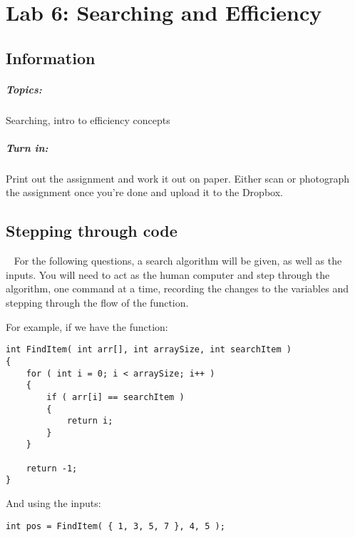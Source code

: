 \documentclass[a4paper,12pt]{book}
\title{}
\author{Rachel Morris}
\date{\today}
\newcommand{\laLab}{Lab 6: Searching and Efficiency\ }
\begin{document}
    \chapter*{\laLab} 

        \section*{Information}
            \paragraph{ Topics: } Searching, intro to efficiency concepts
            \paragraph{ Turn in: } Print out the assignment and work it out on paper.
                Either scan or photograph the assignment once you're done
                and upload it to the Dropbox.

    
    \section{Stepping through code}
    
    \begin{intro}{\ }
        For the following questions, a search algorithm will be given, 
        as well as the inputs. You will need to act as the human computer 
        and step through the algorithm, one command at a time, recording 
        the changes to the variables and stepping through the flow of the function.
        
        For example, if we have the function:
\begin{verbatim}
int FindItem( int arr[], int arraySize, int searchItem )
{	
	for ( int i = 0; i < arraySize; i++ )
	{
		if ( arr[i] == searchItem )
		{
			return i;
		}
	}
	
	return -1;
}
\end{verbatim}

        And using the inputs:
\begin{verbatim}
int pos = FindItem( { 1, 3, 5, 7 }, 4, 5 );
\end{verbatim}

    \end{intro}
\end{document}
